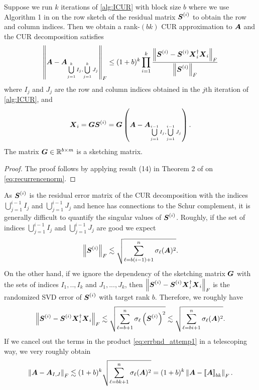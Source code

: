 \begin{theorem} \label{thm:converge}
    Suppose we run $k$ iterations of \cref{alg:ICUR} with block size $b$ where we use Algorithm 1 in \cite{osinsky2025close} on the row sketch of the residual matrix $\boldsymbol{S}^{(i)}$ to obtain the row and column indices. Then we obtain a rank-$(bk)$ CUR approximation to $\boldsymbol{A}$ and the CUR decomposition satisfies
    \begin{equation} \label{eq:errbnd_attemp1}
        \norm{\mat{A} - \mat{A}_{\bigcup\limits_{j=1}^k I_j,\bigcup\limits_{j=1}^k J_j}}_F \leq (1+b)^k \prod\limits_{i = 1}^k \frac{\norm{\mat{S}^{(i)}-\mat{S}^{(i)}\mat{X}_i^\dagger \mat{X}_i}_F}{\norm{\mat{S}^{(i)}}_F}
    \end{equation} where $I_j$ and $J_j$ are the row and column indices obtained in the $j$th iteration of \cref{alg:ICUR}, and
    \begin{equation}
        \boldsymbol{X}_i = \boldsymbol{G}\boldsymbol{S}^{(i)} = \boldsymbol{G}\left(\boldsymbol{A} - \boldsymbol{A}_{\bigcup\limits_{j=1}^{i-1} I_j,\bigcup\limits_{j=1}^{i-1} J_j}\right).
    \end{equation} The matrix $\boldsymbol{G}\in \mathbb{R}^{b\times m}$ is a sketching matrix.
\end{theorem}
\begin{proof}
    The proof follows by applying result (14) in Theorem 2 of \cite{osinsky2025close} on \cref{eq:recurrencenorm}.
\end{proof}
\begin{remark}
    As $\boldsymbol{S}^{(i)}$ is the residual error matrix of the CUR decomposition with the indices $\bigcup_{j=1}^{i-1} I_j$ and $\bigcup_{j=1}^{i-1} J_j$ and hence has connections to the Schur complement, it is generally difficult to quantify the singular values of $\boldsymbol{S}^{(i)}$. Roughly, if the set of indices $\bigcup_{j=1}^{i-1} I_j$ and $\bigcup_{j=1}^{i-1} J_j$ are good we expect
\begin{equation}
    \left\| {\boldsymbol{S}^{(i)}} \right\|_F \lesssim \sqrt{\sum_{\ell = b(i-1)+1}^n \sigma_\ell (\boldsymbol{A})^2}.
\end{equation} On the other hand, if we ignore the dependency of the sketching matrix $\boldsymbol{G}$ with the sets of indices $I_1,..,I_k$ and $J_1,...,J_k$, then $\left\| {\boldsymbol{S}^{(i)}-\boldsymbol{S}^{(i)}\boldsymbol{X}_i^\dagger \boldsymbol{X}_i} \right\|_F$ is the randomized SVD error of $\boldsymbol{S}^{(i)}$ with target rank $b$. Therefore, we roughly have
\begin{equation}
    \left\| {\boldsymbol{S}^{(i)}-\boldsymbol{S}^{(i)}\boldsymbol{X}_i^\dagger \boldsymbol{X}_i} \right\|_F \lesssim \sqrt{\sum_{\ell = b+1}^n \sigma_\ell \left(\boldsymbol{S}^{(i)} \right)^2} \lesssim \sqrt{\sum_{\ell = bi+1}^n \sigma_\ell (\boldsymbol{A})^2}.
\end{equation} If we cancel out the terms in the product \eqref{eq:errbnd_attemp1} in a telescoping way, we very roughly obtain
\begin{equation}
    \left\| {\boldsymbol{A} - \boldsymbol{A}_{I,J}} \right\|_F \lesssim (1+b)^k \sqrt{\sum\limits_{\ell = bk+1}^n \sigma_\ell (\boldsymbol{A})^2} = (1+b)^k \left\| {\boldsymbol{A} - \left\llbracket \boldsymbol{A} \right\rrbracket_{bk}} \right\|_F.
\end{equation}
\end{remark}

